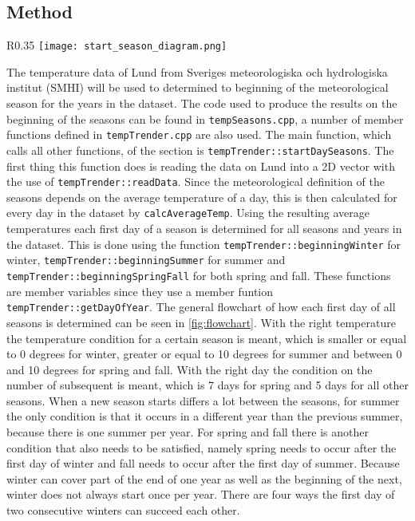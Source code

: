 \subsection{Method}

\begin{wrapfigure}{R}{0.35\textwidth}
\texttt{[image: start\_season\_diagram.png]}
\caption{The code used for the calculation of the start of a season represented in a flowchart.}
\label{fig:flowchart}
\end{wrapfigure}

The temperature data of Lund from Sveriges meteorologiska och hydrologiska institut (SMHI) will be used to determined to beginning of the meteorological season for the years in the dataset.  The code used to produce the results on the beginning of the seasons can be found in \texttt{tempSeasons.cpp}, a number of member functions defined in \texttt{tempTrender.cpp} are also used.  The main function, which calls all other functions, of the section is \texttt{tempTrender::startDaySeasons}.  The first thing this function does is reading the data on Lund into a 2D vector with the use of \texttt{tempTrender::readData}. Since the meteorological definition of the seasons depends on the average temperature of a day, this is then calculated for every day in the dataset by  \texttt{calcAverageTemp}. Using the resulting average temperatures each first day of a season is determined for all seasons and years in the dataset. This is done using the function \texttt{tempTrender::beginningWinter} for winter,  \texttt{tempTrender::beginningSummer} for summer and \texttt{tempTrender::beginningSpringFall} for both spring and fall.  These functions are member variables since they use a member funtion \texttt{tempTrender::getDayOfYear}. The general flowchart of how each first day of all seasons is determined can be seen in \ref{fig:flowchart}. With the right temperature the temperature condition for a certain season is meant, which is smaller or equal to 0 degrees for winter, greater or equal to 10 degrees for summer and between 0 and 10 degrees for spring and fall. With the right day the condition on the number of subsequent is meant, which is 7 days for spring and 5 days for all other seasons. When a new season starts differs a lot between the seasons, for summer the only condition is that it occurs in a different year than the previous summer, because there is one summer per year. For spring and fall there is another condition that also needs to be satisfied, namely spring needs to occur after the first day of winter and fall needs to occur after the first day of summer. Because winter can cover part of the end of one year as well as the beginning of the next, winter does not always start once per year. There are four ways the first day of two consecutive winters can succeed each other. 

